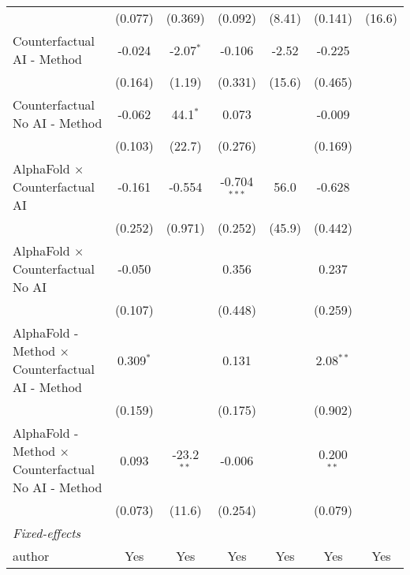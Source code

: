 \begin{tabular}{lcccccc}
                                                              & (0.077)       & (0.369)      & (0.092)        & (8.41)        & (0.141)        & (16.6)\\   
   Counterfactual AI - Method                                 & -0.024        & -2.07$^{*}$  & -0.106         & -2.52         & -0.225         &   \\   
                                                              & (0.164)       & (1.19)       & (0.331)        & (15.6)        & (0.465)        &   \\   
   Counterfactual No AI - Method                              & -0.062        & 44.1$^{*}$   & 0.073          &               & -0.009         &   \\   
                                                              & (0.103)       & (22.7)       & (0.276)        &               & (0.169)        &   \\   
   AlphaFold $\times$ Counterfactual AI                       & -0.161        & -0.554       & -0.704$^{***}$ & 56.0          & -0.628         &   \\   
                                                              & (0.252)       & (0.971)      & (0.252)        & (45.9)        & (0.442)        &   \\   
   AlphaFold $\times$ Counterfactual No AI                    & -0.050        &              & 0.356          &               & 0.237          &   \\   
                                                              & (0.107)       &              & (0.448)        &               & (0.259)        &   \\   
   AlphaFold - Method $\times$ Counterfactual AI - Method     & 0.309$^{*}$   &              & 0.131          &               & 2.08$^{**}$    &   \\   
                                                              & (0.159)       &              & (0.175)        &               & (0.902)        &   \\   
   AlphaFold - Method $\times$ Counterfactual No AI - Method  & 0.093         & -23.2$^{**}$ & -0.006         &               & 0.200$^{**}$   &   \\   
                                                              & (0.073)       & (11.6)       & (0.254)        &               & (0.079)        &   \\   
   \midrule
   \emph{Fixed-effects}\\
   author                                                     & Yes           & Yes          & Yes            & Yes           & Yes            & Yes\\  

\end{tabular}
